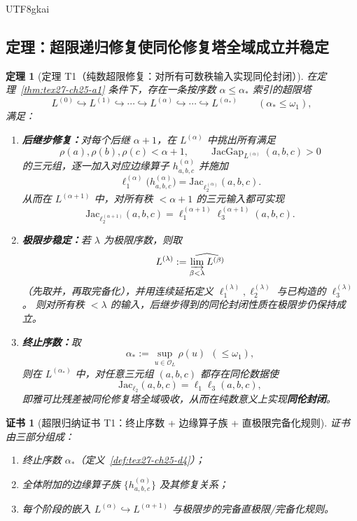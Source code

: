 \documentclass[12pt]{article}
\newtheorem{theorem}{定理}[section]
\newtheorem{Certificate}{证书}[section]
\newcommand{\JacGap}{\operatorname{JacGap}}
\begin{document}
\begin{CJK*}{UTF8}{gkai}
\subsection{定理：超限递归修复使同伦修复塔全域成立并稳定}
\label{subsec:tex27-ch25-theorem1}

\begin{theorem}[定理 T1（纯数超限修复：对所有可数秩输入实现同伦封闭）]
\label{thm:tex27-ch25-t1}
在定理~\ref{thm:tex27-ch25-a1} 条件下，存在一条按序数 $\alpha\le \alpha_\ast$ 索引的超限塔
\[
  L^{(0)}\hookrightarrow L^{(1)}\hookrightarrow\cdots\hookrightarrow L^{(\alpha)}\hookrightarrow\cdots\hookrightarrow
    L^{(\alpha_\ast)}
  \qquad(\alpha_\ast\le\omega_1),
\]
满足：
\begin{enumerate}
  \item \textbf{后继步修复：}对每个后继 $\alpha+1$，在 $L^{(\alpha)}$ 中挑出所有满足
  \[
    \rho(a),\rho(b),\rho(c)<\alpha+1,
    \qquad
    \JacGap_{L^{(\alpha)}}(a,b,c)>0
  \]
  的三元组，逐一加入对应边缘算子 $h_{a,b,c}^{(\alpha)}$ 并施加
  \[
    \ell_1^{(\alpha)}\!\bigl(h_{a,b,c}^{(\alpha)}\bigr)=\mathrm{Jac}_{\ell_2^{(\alpha)}}(a,b,c).
  \]
  从而在 $L^{(\alpha+1)}$ 中，对所有秩 $<\alpha+1$ 的三元输入都可实现
  \[
    \mathrm{Jac}_{\ell_2^{(\alpha+1)}}(a,b,c)=\ell_1^{(\alpha+1)}\ell_3^{(\alpha+1)}(a,b,c).
  \]
  \item \textbf{极限步稳定：}若 $\lambda$ 为极限序数，则取
  \[
    L^{(\lambda)}:=\widehat{\varinjlim_{\beta<\lambda}L^{(\beta)}}
  \]
  （先取并，再取完备化），并用连续延拓定义 $\ell_1^{(\lambda)},\ell_2^{(\lambda)}$ 与已构造的 $\ell_3^{(\lambda)}$。
  则对所有秩 $<\lambda$ 的输入，后继步得到的同伦封闭性质在极限步仍保持成立。
  \item \textbf{终止序数：}取
  \[
    \alpha_\ast:=\sup_{u\in\mathcal{O}_L}\rho(u)\ \ (\le \omega_1),
  \]
  则在 $L^{(\alpha_\ast)}$ 中，对任意三元组 $(a,b,c)$ 都存在同伦数据使
  \[
    \mathrm{Jac}_{\ell_2}(a,b,c)=\ell_1\ell_3(a,b,c),
  \]
  即雅可比残差被同伦修复塔全域吸收，从而在纯数意义上实现\textbf{同伦封闭}。
\end{enumerate}
\end{theorem}

\begin{Certificate}[超限归纳证书 T1：终止序数 + 边缘算子族 + 直极限完备化规则]
\label{cert:tex27-ch25-t1}
证书由三部分组成：
\begin{enumerate}
  \item 终止序数 $\alpha_\ast$（定义~\ref{def:tex27-ch25-d4}）；
  \item 全体附加的边缘算子族 $\{h_{a,b,c}^{(\alpha)}\}$ 及其修复关系；
  \item 每个阶段的嵌入 $L^{(\alpha)}\hookrightarrow L^{(\alpha+1)}$ 与极限步的完备直极限/完备化规则。
\end{enumerate}
\end{Certificate}


\end{CJK*}
\end{document}
